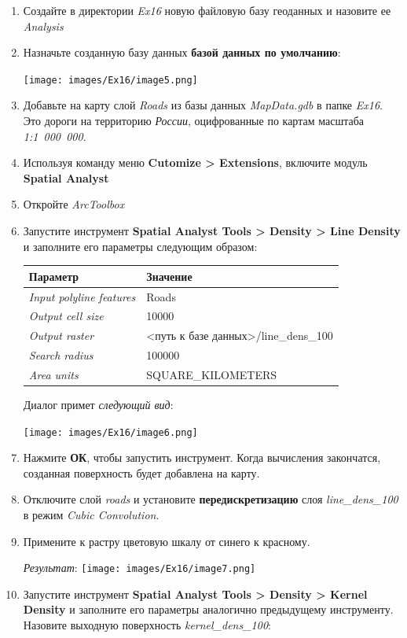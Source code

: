 \documentclass[12pt,]{book}
\begin{document}
\begin{enumerate}
\def\labelenumi{\arabic{enumi}.}
\item
  Создайте в директории \emph{Ex16} новую файловую базу геоданных и назовите ее \emph{Analysis}
\item
  Назначьте созданную базу данных \textbf{базой данных по умолчанию}:

  \texttt{[image: images/Ex16/image5.png]}
\item
  Добавьте на карту слой \emph{Roads} из базы данных \emph{MapData.gdb} в папке \emph{Ex16}. Это дороги на территорию \emph{России}, оцифрованные по картам масштаба \emph{1:1~000~000}.
\item
  Используя команду меню \textbf{Cutomize \textgreater{} Extensions}, включите модуль \textbf{Spatial Analyst}
\item
  Откройте \emph{ArcToolbox}
\item
  Запустите инструмент \textbf{Spatial Analyst Tools \textgreater{} Density \textgreater{} Line Density} и заполните его параметры следующим образом:

  \begin{longtable}[]{@{}ll@{}}
  \toprule
  Параметр & Значение\tabularnewline
  \midrule
  \endhead
  \emph{Input polyline features} & Roads\tabularnewline
  \emph{Output cell size} & 10000\tabularnewline
  \emph{Output raster} & \textless{}путь к базе данных\textgreater{}/line\_dens\_100\tabularnewline
  \emph{Search radius} & 100000\tabularnewline
  \emph{Area units} & SQUARE\_KILOMETERS\tabularnewline
  \bottomrule
  \end{longtable}

  Диалог примет \emph{следующий вид}:

  \texttt{[image: images/Ex16/image6.png]}
\item
  Нажмите \textbf{ОК}, чтобы запустить инструмент. Когда вычисления закончатся, созданная поверхность будет добавлена на карту.
\item
  Отключите слой \emph{roads} и установите \textbf{передискретизацию} слоя \emph{line\_dens\_100} в режим \emph{Cubic Convolution}.
\item
  Примените к растру цветовую шкалу от синего к красному.

  \emph{Результат}:
  \texttt{[image: images/Ex16/image7.png]}
\item
  Запустите инструмент \textbf{Spatial Analyst Tools \textgreater{} Density \textgreater{} Kernel Density} и заполните его параметры аналогично предыдущему инструменту. Назовите выходную поверхность \emph{kernel\_dens\_100}:


\end{enumerate}
\end{document}
